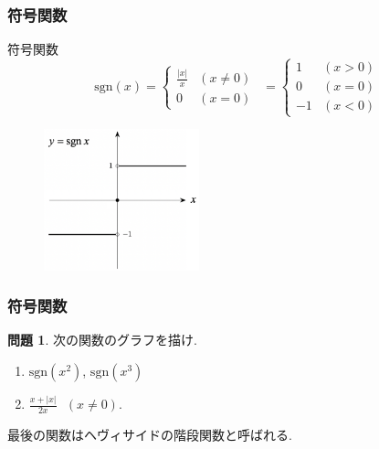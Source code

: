 \documentclass[dvipdfmx,cjk,10.2pt]{beamer}
\theoremstyle{definition}
\newtheorem{Prob}[Thm]{問題}
\begin{document}
\begin{frame}
\frametitle{符号関数}   

符号関数
$$
\mathrm{sgn}(x) = 
\begin{cases}
\frac{|x|}{x} & (x \ne 0) \\
0 & (x =0)
 \end{cases} \ \ 
 =
\begin{cases}
1 & (x > 0) \\
0 & (x =0) \\
-1 & (x<0)
 \end{cases}
$$

\vspace{-1mm}

\begin{figure}[htbp]
 \begin{center} 
  \includegraphics[width=45mm]{sgn.png}
 \end{center}
\end{figure}
\vspace{-4mm}

\end{frame}







\begin{frame}
\frametitle{符号関数}   

\begin{Prob}
次の関数のグラフを描け. 
\begin{enumerate}
\item $\mathrm{sgn}(x^2)$, $\mathrm{sgn}(x^3)$
\item $\frac{x+|x|}{2x} \ \ \ (x \neq 0)$. 
\end{enumerate}
\end{Prob}
最後の関数はヘヴィサイドの階段関数と呼ばれる. 


\end{frame}
\end{document}

